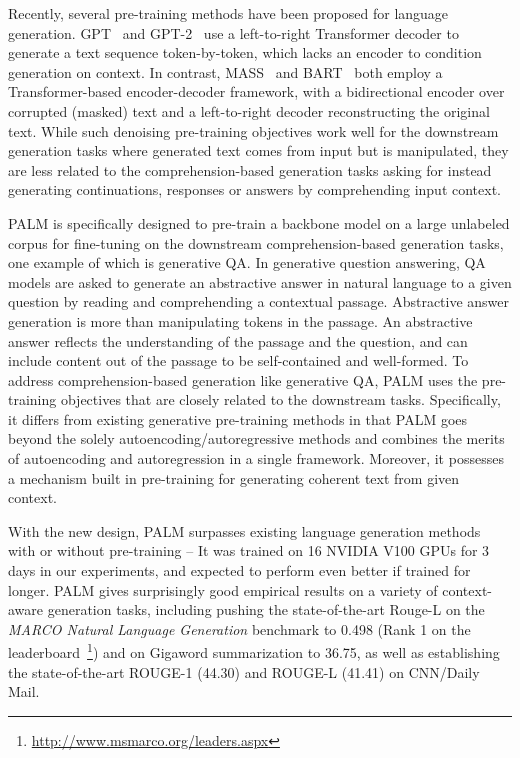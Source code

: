 \documentclass[11pt,a4paper]{article}
\newcommand{\method}{PALM\xspace}
\begin{document}
Recently, several pre-training methods have been proposed for language generation. GPT~\cite{Radford2018ImprovingLU} and GPT-2~\cite{gpt2} use a left-to-right Transformer decoder to generate a text sequence token-by-token, which lacks an encoder to condition generation on context. In contrast, MASS~\cite{mass2019song} and BART~\cite{bart2019} both employ a Transformer-based encoder-decoder framework, with a bidirectional encoder over corrupted (masked) text and a left-to-right decoder reconstructing the original text. While such denoising pre-training objectives work well for the downstream generation tasks where generated text comes from input but is manipulated, they are less related to the comprehension-based generation tasks asking for instead generating continuations, responses or answers by comprehending input context.

\method is specifically designed to pre-train a backbone model on a large unlabeled corpus for fine-tuning on the downstream comprehension-based generation tasks, one example of which is generative QA. In generative question answering, QA models are asked to generate an abstractive answer in natural language to a given question by reading and comprehending a contextual passage. Abstractive answer generation is more than manipulating tokens in the passage. An abstractive answer reflects the understanding of the passage and the question, and can include content out of the passage to be self-contained and well-formed. To address comprehension-based generation like generative QA, \method uses the pre-training objectives that are closely related to the downstream tasks. Specifically, it differs from existing generative pre-training methods in that \method goes beyond the solely autoencoding/autoregressive methods and combines the merits of autoencoding and autoregression in a single framework. Moreover, it possesses a mechanism built in pre-training for generating coherent text from given context.

With the new design, \method surpasses existing language generation methods with or without pre-training -- It was trained on 16 NVIDIA V100 GPUs for 3 days in our experiments, and expected to perform even better if trained for longer. \method gives surprisingly good empirical results on a variety of context-aware generation tasks, including pushing the state-of-the-art Rouge-L on the \emph{MARCO Natural Language Generation} benchmark to 0.498 (Rank 1 on the leaderboard~\footnote{\url{http://www.msmarco.org/leaders.aspx}}) and on Gigaword summarization to 36.75, as well as establishing the state-of-the-art ROUGE-1 (44.30) and ROUGE-L (41.41) on CNN/Daily Mail.
\end{document}
